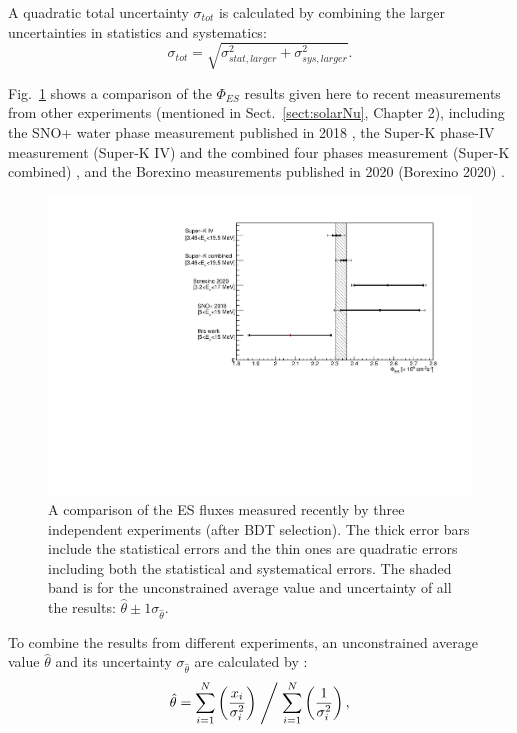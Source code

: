 A quadratic total uncertainty $\sigma_{tot}$ is calculated by combining the larger uncertainties in statistics and systematics:
\begin{equation}
\sigma_{tot}=\sqrt{\sigma^2_{stat,larger}+\sigma^2_{sys,larger}}.
\end{equation}

Fig.~\ref{fig:ESfluxCompare} shows a comparison of the $\Phi_{ES}$ results given here to recent measurements from other experiments (mentioned in Sect.~\ref{sect:solarNu}, Chapter 2), including the SNO+ water phase measurement published in 2018 \cite{anderson2019measurement}, the Super-K phase-IV measurement (Super-K IV) and the combined four phases measurement (Super-K combined) \cite{abe2016solar}, and the Borexino measurements published in 2020 (Borexino 2020) \cite{agostini2020improved}.

\begin{figure}[!htb]
	\centering
	\includegraphics[width=12cm]{ESfluxCompare.pdf}
	\caption[A comparison of the ES flux measured recently by three independent experiments (after BDT selection).]{A comparison of the ES fluxes measured recently by three independent experiments (after BDT selection). The thick error bars include the statistical errors and the thin ones are quadratic errors including both the statistical and systematical errors. The shaded band is for the unconstrained average value and uncertainty of all the results: $\hat \theta \pm 1\sigma_{\hat \theta}$.}
	\label{fig:ESfluxCompare}
\end{figure}

To combine the results from different experiments, an unconstrained average value $\hat \theta$ and its uncertainty $\sigma_{\hat\theta}$ are calculated by \cite{pdg2020,behnke2013data}:
\begin{equation}
\hat \theta = \sum_{i=1}^{N} \left(\frac{x_i}{\sigma_i^2}\right)\Biggm/\sum_{i=1}^{N}\left(\frac{1}{\sigma_i^2}\right),
\end{equation}

